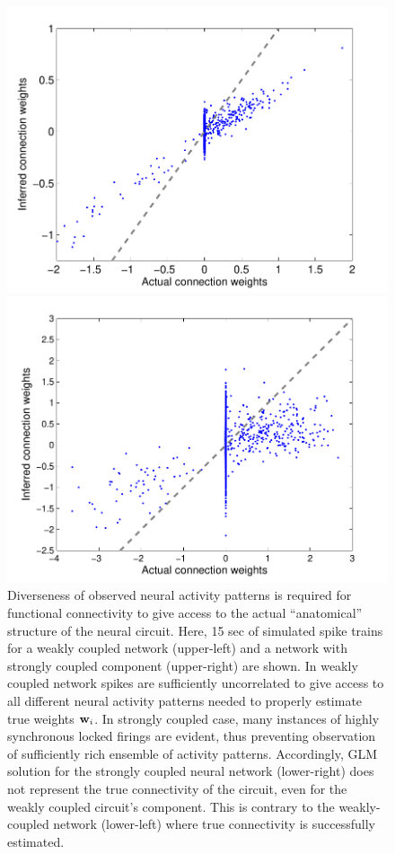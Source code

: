 \begin{figure}[h]
\begin{minipage}[c]{0.45\hsize}
\includegraphics[width=\hsize]{../figs/FigureA8_weak_corr}
\end{minipage}
\begin{minipage}[c]{0.45\hsize}
\includegraphics[width=\hsize]{../figs/FigureA8_strong_corr}
\end{minipage}
\caption{
Diverseness of observed neural activity patterns is required for
functional connectivity to give access to the actual ``anatomical'' structure 
of the neural circuit. Here, 15 sec of simulated spike trains for a weakly coupled network (upper-left) and a network with strongly coupled component (upper-right) are shown. 
In weakly coupled network spikes are sufficiently uncorrelated to give access to all different neural activity patterns needed to properly estimate true weights ${\bf w}_i$. In strongly coupled case, many instances of highly synchronous locked firings are evident, thus preventing observation of sufficiently rich ensemble of activity patterns.
Accordingly, GLM solution for the strongly coupled neural network (lower-right) does not
represent the true connectivity of the circuit, even for the weakly coupled circuit's component. This is contrary to the weakly-coupled network (lower-left) where true connectivity is successfully estimated.}
\label{fig:rasters}
\end{figure}

